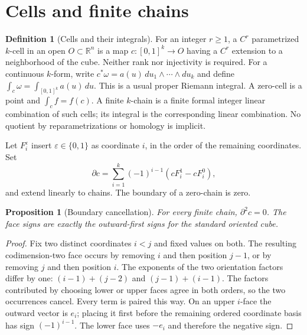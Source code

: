\documentclass[11pt,oneside,openany]{book}
\newtheorem{proposition}[theorem]{Proposition}
\theoremstyle{definition}
\newtheorem{definition}[theorem]{Definition}
\theoremstyle{remark}
\newcommand{\R}{\mathbb R}
\newcommand{\eps}{\varepsilon}
\newcommand{\family}[1]{}
\begin{document}
\section{Cells and finite chains}
\family{K04.15.01}\family{K04.15.02}\family{K04.15.05}
\begin{definition}[Cells and their integrals]\label{d04:15:cells}
For an integer $r\ge1$, a $C^r$ parametrized $k$-cell in an open $O\subset\R^n$ is a map
$c:[0,1]^k\to O$ having a $C^r$ extension to a neighborhood of the cube.
Neither rank nor injectivity is required. For a continuous $k$-form, write
$c^*\omega=a(u)\,du_1\wedge\cdots\wedge du_k$ and define
$\int_c\omega=\int_{[0,1]^k}a(u)\,du$. This is a usual proper Riemann
integral. A zero-cell is a point and $\int_c f=f(c)$.
A finite $k$-chain is a finite formal integer linear combination of such
cells; its integral is the corresponding linear combination. No quotient
by reparametrizations or homology is implicit.

Let $F_i^\eps$ insert $\eps\in\{0,1\}$ as coordinate $i$, in the order
of the remaining coordinates. Set
\[
 \partial c=\sum_{i=1}^k(-1)^{i-1}(cF_i^1-cF_i^0),
\]
and extend linearly to chains. The boundary of a zero-chain is zero.
\end{definition}

\begin{proposition}[Boundary cancellation]\label{d04:15:boundary-square}
For every finite chain, $\partial^2c=0$. The face signs are exactly the
outward-first signs for the standard oriented cube.
\end{proposition}
\begin{proof}
Fix two distinct coordinates $i<j$ and fixed values on both. The resulting
codimension-two face occurs by removing $i$ and then position $j-1$, or
by removing $j$ and then position $i$. The exponents of the two orientation
factors differ by one: $(i-1)+(j-2)$ and $(j-1)+(i-1)$.
The factors contributed by choosing lower or upper faces agree in both
orders, so the two occurrences cancel. Every term is paired this way.
On an upper $i$-face the outward vector is $e_i$; placing it first before
the remaining ordered coordinate basis has sign $(-1)^{i-1}$.
The lower face uses $-e_i$ and therefore the negative sign.
\end{proof}
\end{document}
